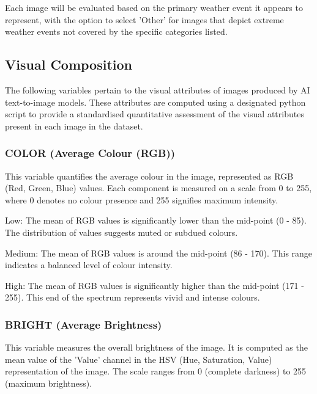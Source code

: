 Each image will be evaluated based on the primary weather event it appears to represent, with the option to select 'Other' for images that depict extreme weather events not covered by the specific categories listed.


\subsection{Visual Composition}

The following variables pertain to the visual attributes of images produced by AI text-to-image models. These attributes are computed using a designated python script to provide a standardised quantitative assessment of the visual attributes present in each image in the dataset.

\subsubsection*{COLOR (Average Colour (RGB))}
This variable quantifies the average colour in the image, represented as RGB (Red, Green, Blue) values. Each component is measured on a scale from 0 to 255, where 0 denotes no colour presence and 255 signifies maximum intensity.


\begin{description}[leftmargin=2.5cm, style=multiline, labelwidth=1.5cm]
\item[1] Low: The mean of RGB values is significantly lower than the mid-point (0 - 85). The distribution of values suggests muted or subdued colours.
\item[2] Medium: The mean of RGB values is around the mid-point (86 - 170). This range indicates a balanced level of colour intensity.
\item[3] High: The mean of RGB values is significantly higher than the mid-point (171 - 255). This end of the spectrum represents vivid and intense colours.
\end{description}



\subsubsection*{BRIGHT (Average Brightness)}
This variable measures the overall brightness of the image. It is computed as the mean value of the 'Value' channel in the HSV (Hue, Saturation, Value) representation of the image. The scale ranges from 0 (complete darkness) to 255 (maximum brightness).

